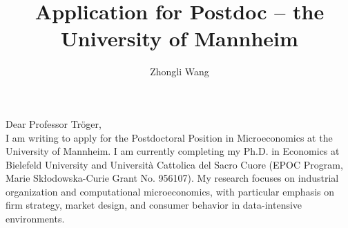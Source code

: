 \documentclass{nfr}
\title{Application for Postdoc – the University of Mannheim}
\author{Zhongli Wang}
\begin{document}

% 
% 
% 
% 


\maketitle


\noindent Dear Professor Tröger,\\

I am writing to apply for the Postdoctoral Position in Microeconomics at the University of Mannheim. 
I am currently completing my Ph.D. in Economics at Bielefeld University and Università Cattolica del Sacro Cuore (EPOC Program, Marie Skłodowska-Curie Grant No. 956107). 
My research focuses on industrial organization and computational microeconomics, with particular emphasis on firm strategy, market design, and consumer behavior in data-intensive environments. \\
\end{document}
